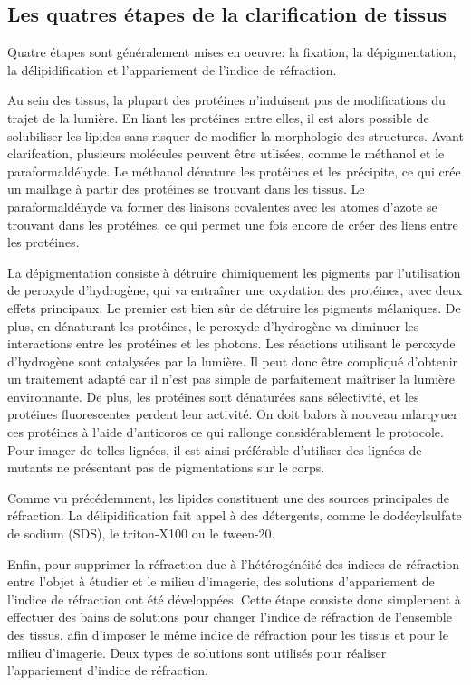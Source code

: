 \documentclass[\main/main.tex]{subfiles}
\begin{document}
\subsection{Les quatres étapes de la clarification de tissus}

Quatre étapes sont généralement mises en oeuvre\cite{tainaka_2016,ueda_2020}: la fixation, la dépigmentation, la délipidification et l'appariement de l'indice de réfraction.
%

%
Au sein des tissus, la plupart des protéines n'induisent pas de modifications du trajet de la lumière. En liant les protéines entre elles, il est alors possible de solubiliser les lipides sans risquer de modifier la morphologie des structures. Avant clarifcation, plusieurs molécules peuvent être utlisées, comme le méthanol et le paraformaldéhyde. Le méthanol dénature les protéines et les précipite, ce qui crée un maillage à partir des protéines se trouvant dans les tissus. Le paraformaldéhyde va former des liaisons covalentes avec les atomes d'azote se trouvant dans les protéines, ce qui permet une fois encore de créer des liens entre les protéines.

%
La dépigmentation consiste à détruire chimiquement les pigments par l'utilisation de peroxyde d'hydrogène, qui va entraîner une oxydation des protéines, avec deux effets principaux. Le premier est bien sûr de détruire les pigments mélaniques. De plus, en dénaturant les protéines, le peroxyde d'hydrogène va diminuer les interactions entre les protéines et les photons.
%
Les réactions utilisant le peroxyde d'hydrogène sont catalysées par la lumière. Il peut donc être compliqué d'obtenir un traitement adapté car il n'est pas simple de parfaitement maîtriser la lumière environnante. De plus, les protéines sont dénaturées sans sélectivité, et les protéines fluorescentes perdent leur activité. On doit balors à nouveau mlarqyuer ces protéines à l'aide d'anticoros ce qui rallonge considérablement le protocole.
%
Pour imager de telles lignées, il est ainsi préférable d'utiliser des lignées de  mutants ne présentant pas de pigmentations sur le corps\cite{white_2008,antinucci_2016}.

Comme vu précédemment, les lipides constituent une des sources principales de réfraction. %
%
La délipidification fait appel à des détergents, comme le dodécylsulfate de sodium (SDS), le triton-X100 ou le tween-20.

%
Enfin, pour supprimer la réfraction due à l'hétérogénéité des indices de réfraction entre l'objet à étudier et le milieu d'imagerie, des solutions d'appariement de l'indice de réfraction ont été développées.
%
Cette étape consiste donc simplement à effectuer des bains de solutions pour changer l'indice de réfraction de l'ensemble des tissus, afin d'imposer le même indice de réfraction pour les tissus et pour le milieu d'imagerie.
%
Deux types de solutions sont utilisés pour réaliser l'appariement d'indice de réfraction.
\end{document}
